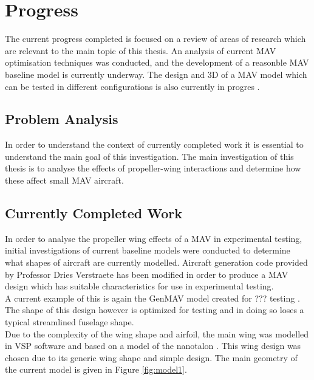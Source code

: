 \graphicspath{{./Figs/}}

\chapter{Progress} 
The current progress completed is focused on a review of areas of research which are relevant to the main topic of this thesis. An analysis of current MAV optimisation techniques was conducted, and the development of a reasonble MAV baseline model is currently underway. The design and 3D of a MAV model which can be tested in different configurations is also currently in progres . 

\section{Problem Analysis}
\label{sec: ProblemAnalysis}
In order to understand the context of currently completed work it is essential to understand the main goal of this investigation. The main investigation of this thesis is to analyse the effects of propeller-wing interactions and determine how these affect small MAV aircraft. 

\section{Currently Completed Work}
\label{sec: completedWork}

In order to analyse the propeller wing effects of a MAV in experimental testing, initial investigations of current baseline models were conducted to determine what shapes of aircraft are currently modelled. Aircraft generation code provided by Professor Dries Verstraete has been modified in order to produce a MAV design which has suitable characteristics for use in experimental testing.\\

A current example of this is again the GenMAV model created for ??? testing . The shape of this design however is optimized for testing and in doing so loses a typical streamlined fuselage shape. \\


Due to the complexity of the wing shape and airfoil, the main wing was modelled in VSP software and based on a model of the nanotalon \cite{} . This wing design was chosen due to its generic wing shape and simple design. The main geometry of the current model is given in Figure \ref{fig:model1}.

